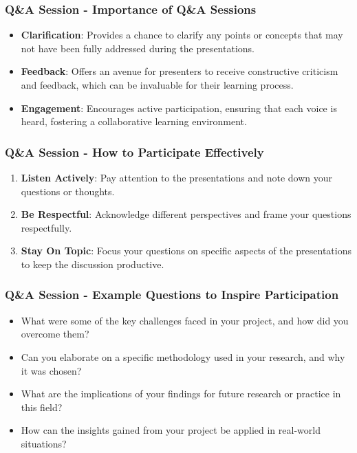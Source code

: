 \documentclass[aspectratio=169]{beamer}
\begin{document}
\begin{frame}[fragile]
  \frametitle{Q\&A Session - Importance of Q\&A Sessions}
  \begin{itemize}
    \item \textbf{Clarification}: Provides a chance to clarify any points or concepts that may not have been fully addressed during the presentations.
    \item \textbf{Feedback}: Offers an avenue for presenters to receive constructive criticism and feedback, which can be invaluable for their learning process.
    \item \textbf{Engagement}: Encourages active participation, ensuring that each voice is heard, fostering a collaborative learning environment.
  \end{itemize}
\end{frame}

\begin{frame}[fragile]
  \frametitle{Q\&A Session - How to Participate Effectively}
  \begin{enumerate}
    \item \textbf{Listen Actively}: Pay attention to the presentations and note down your questions or thoughts.
    \item \textbf{Be Respectful}: Acknowledge different perspectives and frame your questions respectfully.
    \item \textbf{Stay On Topic}: Focus your questions on specific aspects of the presentations to keep the discussion productive.
  \end{enumerate}
\end{frame}

\begin{frame}[fragile]
  \frametitle{Q\&A Session - Example Questions to Inspire Participation}
  \begin{itemize}
    \item What were some of the key challenges faced in your project, and how did you overcome them?
    \item Can you elaborate on a specific methodology used in your research, and why it was chosen?
    \item What are the implications of your findings for future research or practice in this field?
    \item How can the insights gained from your project be applied in real-world situations?
  \end{itemize}
\end{frame}
\end{document}
